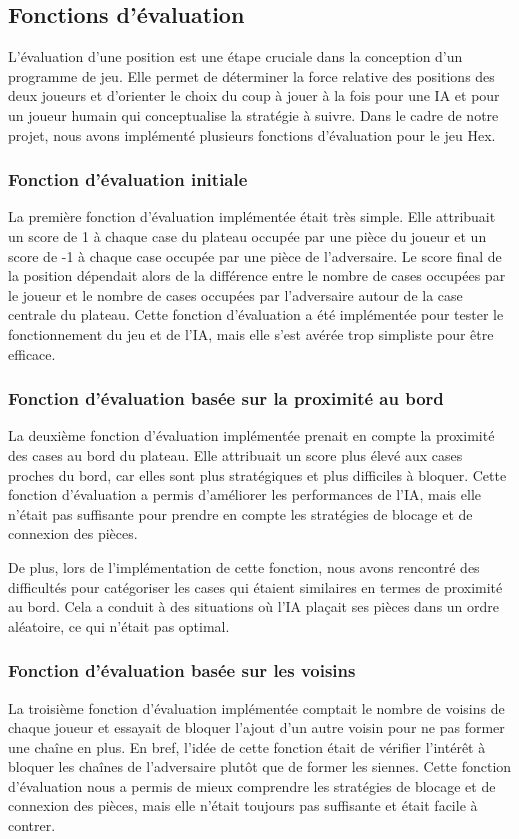 \subsection{Fonctions d'évaluation}

L'évaluation d'une position est une étape cruciale dans la conception d'un programme de jeu. 
Elle permet de déterminer la force relative des positions des deux joueurs et d'orienter le choix du coup à jouer à la fois
pour une IA et pour un joueur humain qui conceptualise la stratégie à suivre.
Dans le cadre de notre projet, nous avons implémenté plusieurs fonctions d'évaluation pour le jeu Hex.

\subsubsection{Fonction d'évaluation initiale}
La première fonction d'évaluation implémentée était très simple. Elle attribuait un score de 1 à chaque case du plateau
occupée par une pièce du joueur et un score de -1 à chaque case occupée par une pièce de l'adversaire.
Le score final de la position dépendait alors de la différence entre le nombre de cases occupées par le joueur
et le nombre de cases occupées par l'adversaire autour de la case centrale du plateau.
Cette fonction d'évaluation a été implémentée pour tester le fonctionnement du jeu et de l'IA, mais elle s'est avérée
trop simpliste pour être efficace.

\subsubsection{Fonction d'évaluation basée sur la proximité au bord}
La deuxième fonction d'évaluation implémentée prenait en compte la proximité des cases au bord du plateau.
Elle attribuait un score plus élevé aux cases proches du bord, car elles sont plus stratégiques et plus difficiles à bloquer.
Cette fonction d'évaluation a permis d'améliorer les performances de l'IA, mais elle n'était pas suffisante pour
prendre en compte les stratégies de blocage et de connexion des pièces.

De plus, lors de l'implémentation de cette fonction, nous avons rencontré des difficultés pour catégoriser les cases
qui étaient similaires en termes de proximité au bord. Cela a conduit à des situations où l'IA plaçait ses pièces
dans un ordre aléatoire, ce qui n'était pas optimal.

\subsubsection{Fonction d'évaluation basée sur les voisins}
La troisième fonction d'évaluation implémentée comptait le nombre de voisins de chaque joueur et essayait de bloquer
l'ajout d'un autre voisin pour ne pas former une chaîne en plus. En bref, l'idée de cette fonction était de vérifier
l'intérêt à bloquer les chaînes de l'adversaire plutôt que de former les siennes.
Cette fonction d'évaluation nous a permis de mieux comprendre les stratégies de blocage et de connexion des pièces,
mais elle n'était toujours pas suffisante et était facile à contrer.

